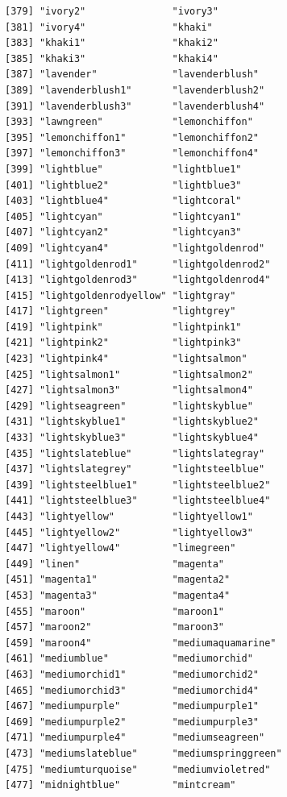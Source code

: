 \documentclass[a4paperpaper,]{article}
\begin{document}
\begin{verbatim}
[379] "ivory2"               "ivory3"              
[381] "ivory4"               "khaki"               
[383] "khaki1"               "khaki2"              
[385] "khaki3"               "khaki4"              
[387] "lavender"             "lavenderblush"       
[389] "lavenderblush1"       "lavenderblush2"      
[391] "lavenderblush3"       "lavenderblush4"      
[393] "lawngreen"            "lemonchiffon"        
[395] "lemonchiffon1"        "lemonchiffon2"       
[397] "lemonchiffon3"        "lemonchiffon4"       
[399] "lightblue"            "lightblue1"          
[401] "lightblue2"           "lightblue3"          
[403] "lightblue4"           "lightcoral"          
[405] "lightcyan"            "lightcyan1"          
[407] "lightcyan2"           "lightcyan3"          
[409] "lightcyan4"           "lightgoldenrod"      
[411] "lightgoldenrod1"      "lightgoldenrod2"     
[413] "lightgoldenrod3"      "lightgoldenrod4"     
[415] "lightgoldenrodyellow" "lightgray"           
[417] "lightgreen"           "lightgrey"           
[419] "lightpink"            "lightpink1"          
[421] "lightpink2"           "lightpink3"          
[423] "lightpink4"           "lightsalmon"         
[425] "lightsalmon1"         "lightsalmon2"        
[427] "lightsalmon3"         "lightsalmon4"        
[429] "lightseagreen"        "lightskyblue"        
[431] "lightskyblue1"        "lightskyblue2"       
[433] "lightskyblue3"        "lightskyblue4"       
[435] "lightslateblue"       "lightslategray"      
[437] "lightslategrey"       "lightsteelblue"      
[439] "lightsteelblue1"      "lightsteelblue2"     
[441] "lightsteelblue3"      "lightsteelblue4"     
[443] "lightyellow"          "lightyellow1"        
[445] "lightyellow2"         "lightyellow3"        
[447] "lightyellow4"         "limegreen"           
[449] "linen"                "magenta"             
[451] "magenta1"             "magenta2"            
[453] "magenta3"             "magenta4"            
[455] "maroon"               "maroon1"             
[457] "maroon2"              "maroon3"             
[459] "maroon4"              "mediumaquamarine"    
[461] "mediumblue"           "mediumorchid"        
[463] "mediumorchid1"        "mediumorchid2"       
[465] "mediumorchid3"        "mediumorchid4"       
[467] "mediumpurple"         "mediumpurple1"       
[469] "mediumpurple2"        "mediumpurple3"       
[471] "mediumpurple4"        "mediumseagreen"      
[473] "mediumslateblue"      "mediumspringgreen"   
[475] "mediumturquoise"      "mediumvioletred"     
[477] "midnightblue"         "mintcream"           

\end{verbatim}
\end{document}
